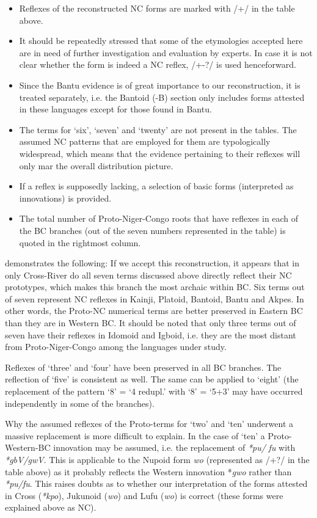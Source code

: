 \begin{itemize}
\item  Reflexes of the reconstructed NC forms are marked with /+/ in the table above. 
\item  It should be repeatedly stressed that some of the etymologies accepted here are in need of further investigation and evaluation by experts. In case it is not clear whether the form is indeed a NC reflex, /+-?/ is used henceforward.
\item  Since the Bantu evidence is of great importance to our reconstruction, it is treated separately, i.e. the Bantoid (-B) section only includes forms attested in these languages except for those found in Bantu.
\item  The terms for ‘six’, ‘seven’ and ‘twenty’ are not present in the tables. The assumed NC patterns that are employed for them are typologically widespread, which means that the evidence pertaining to their reflexes will only mar the overall distribution picture.
\item  If a reflex is supposedly lacking, a selection of basic forms (interpreted as innovations) is provided.
\item  The total number of Proto-Niger-Congo roots that have reflexes in each of the BC branches (out of the seven numbers represented in the table) is quoted in the rightmost column.
\end{itemize} 

 demonstrates the following:
If we accept this reconstruction, it appears that in only Cross-River do all seven terms discussed above directly reflect their NC prototypes, which makes this branch the most archaic within BC. Six terms out of seven represent NC reflexes in Kainji, Platoid, Bantoid, Bantu and Akpes. In other words, the Proto-NC numerical terms are better preserved in Eastern BC than they are in Western BC. It should be noted that only three terms out of seven have their reflexes in Idomoid and Igboid, i.e. they are the most distant from Proto-Niger-Congo among the languages under study.

Reflexes of ‘three’ and ‘four’ have been preserved in all BC branches. The reflection of ‘five’ is consistent as well. The same can be applied to ‘eight’ (the replacement of the pattern ‘8’ = ‘4 redupl.’ with ‘8’ = ‘5+3’ may have occurred independently in some of the branches).

Why the assumed reflexes of the Proto-terms for ‘two’ and ‘ten’ underwent a massive replacement is more difficult to explain. In the case of ‘ten’ a Proto-Western-BC innovation may be assumed, i.e. the replacement of \textit{*pu}\textit{/} \textit{fu} with \textit{*gbV}\textit{/gwV}. This is applicable to the Nupoid form \textit{wo} (represented as /+?/ in the table above) as it probably reflects the Western innovation *\textit{gwo} rather than \textit{*pu}\textit{/fu}. This raises doubts as to whether our interpretation of the forms attested in Cross (\textit{*kpo}), Jukunoid (\textit{wo}) and Lufu (\textit{wo}) is correct (these forms were explained above as NC). 

